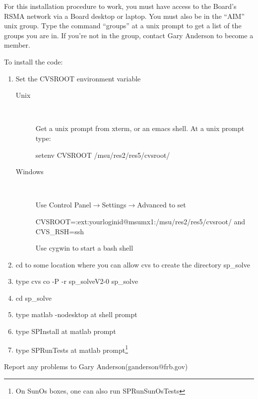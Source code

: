 
For this installation procedure to work,
you must have access to the Board's RSMA network via a Board
desktop or laptop.
You must also be in the ``AIM''
unix group. Type the command ``groups'' 
at a unix prompt to get a list of the groups you are in. If you're not
in the group, contact Gary Anderson to become a member.

To install the code:
\begin{enumerate}
\item Set the CVSROOT environment variable 
\begin{description}
\item[Unix] \ 

Get a unix prompt from xterm, or an emacs shell. At a unix prompt type:

setenv CVSROOT /msu/res2/res5/cvsroot/ 
\item[Windows] \ 

Use Control Panel$\rightarrow$Settings$\rightarrow$Advanced 
to set

CVSROOT=:ext:yourloginid@msumx1:/msu/res2/res5/cvsroot/ and CVS\_RSH=ssh

Use cygwin to start a bash shell

\end{description}

\item cd to some location where you can allow cvs to create the directory sp\_solve

\item type cvs co -P -r sp\_solveV2-0 sp\_solve
\item cd sp\_solve
\item type matlab -nodesktop at shell prompt
\item type SPInstall at matlab prompt
\item type SPRunTests  at matlab prompt\footnote{On SunOs boxes, one can
also run SPRunSunOsTests}
\end{enumerate}

Report any problems to Gary Anderson(ganderson@frb.gov)

